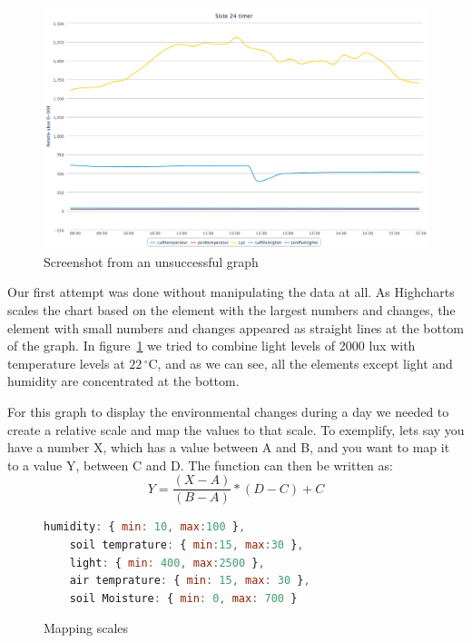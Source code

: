 \begin{figure}
\centering
\includegraphics[width=1\textwidth]{img/interface/badgraph.png}
\caption{Screenshot from an unsuccessful graph}
\label{fig:badgraph}
\end{figure}

Our first attempt was done without manipulating the data at all. As Highcharts scales the chart based on the element with the largest numbers and changes, the element with small numbers and changes appeared as straight lines at the bottom of the graph. In figure~\ref{fig:badgraph} we tried to combine light levels of 2000 lux with temperature levels at $22\,^{\circ}\mathrm{C}$, and as we can see, all the elements except light and humidity are concentrated at the bottom. 

For this graph to display the environmental changes during a day we needed to create a relative scale and map the values to that scale. To exemplify, lets say you have a number X, which has a value between A and B, and you want to map it to a value Y, between C and D. The function can then be written as: 
\begin{equation}
Y = \frac{(X-A)}{(B-A)} * (D-C) + C
\end{equation}



\begin{figure}[H]
	\begin{lstlisting}[language=javascript]
	humidity: { min: 10, max:100 },
	soil temprature: { min:15, max:30 },
	light: { min: 400, max:2500 },
	air temprature: { min: 15, max: 30 },
	soil Moisture: { min: 0, max: 700 }
	\end{lstlisting}
	\caption{Mapping scales}
	\label{fig:mapscale}
\end{figure}

